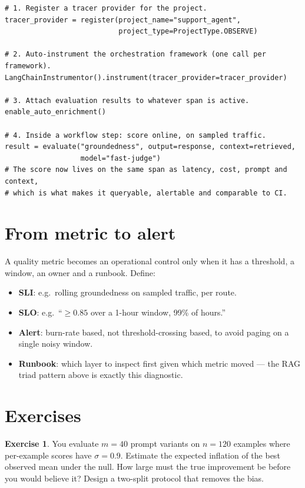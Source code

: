 \documentclass[11pt,twoside,openright]{book}
\theoremstyle{definition}
\newtheorem{exercise}{Exercise}[chapter]
\theoremstyle{plain}
\theoremstyle{remark}
\newcommand{\term}[1]{\textbf{#1}}
\begin{document}
\begin{lstlisting}[style=py, caption={The integration shape every tool in this
category converges on: register a tracer, auto-instrument the framework, and
attach evaluation scores to the active span. Names differ; the pattern does not.}]
# 1. Register a tracer provider for the project.
tracer_provider = register(project_name="support_agent",
                           project_type=ProjectType.OBSERVE)

# 2. Auto-instrument the orchestration framework (one call per framework).
LangChainInstrumentor().instrument(tracer_provider=tracer_provider)

# 3. Attach evaluation results to whatever span is active.
enable_auto_enrichment()

# 4. Inside a workflow step: score online, on sampled traffic.
result = evaluate("groundedness", output=response, context=retrieved,
                  model="fast-judge")
# The score now lives on the same span as latency, cost, prompt and context,
# which is what makes it queryable, alertable and comparable to CI.
\end{lstlisting}

\section{From metric to alert}

A quality metric becomes an operational control only when it has a threshold, a
window, an owner and a runbook. Define:

\begin{itemize}[leftmargin=1.4em]
  \item \term{SLI}: e.g.\ rolling groundedness on sampled traffic, per route.
  \item \term{SLO}: e.g.\ ``$\ge 0.85$ over a 1-hour window, 99\% of hours.''
  \item \term{Alert}: burn-rate based, not threshold-crossing based, to avoid
        paging on a single noisy window.
  \item \term{Runbook}: which layer to inspect first given which metric moved ---
        the RAG triad pattern above is exactly this diagnostic.
\end{itemize}

\section{Exercises}

\begin{exercise}
You evaluate $m=40$ prompt variants on $n=120$ examples where per-example scores
have $\sigma = 0.9$. Estimate the expected inflation of the best observed mean
under the null. How large must the true improvement be before you would believe
it? Design a two-split protocol that removes the bias.
\end{exercise}
\end{document}
